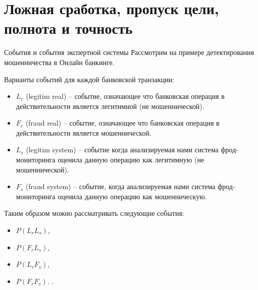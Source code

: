 \section{Ложная сработка, пропуск цели, полнота и точность}\label{section:presicion_and_recall}


\begin{frame}{События и события экспертной системы}
\footnotesize
Рассмотрим на примере детектирования 
мошенничества в Онлайн банкинге.

Варианты событий для каждой банковской транзакции:
\begin{itemize}
	\item $L_r$ (legitim real) -- событие, означающее что банковская операция в действительности является легитимной (не мошеннической).
	\item $F_r$ (fraud real) -- событие, означающее что банковская операция в действительности является мошеннической. 
	\item $L_s$ (legitim system) -- событие когда анализируемая нами система фрод-мониторинга оценила данную операцию как легитимную (не мошеннической).
	\item $F_s$ (fraud system) -- событие, когда анализируемая нами система фрод-мониторинга оценила данную операцию как мошенническую.
\end{itemize}

\end{frame}

\begin{frame}

Таким образом можно рассматривать следующие события: 
\begin{itemize}
	\item $P(L_r L_s)$,
	\item $P(F_r L_s)$, 
	\item $P(L_r F_s)$,
	\item $P(F_r  F_s)$.
	.
\end{itemize}



\end{frame}

